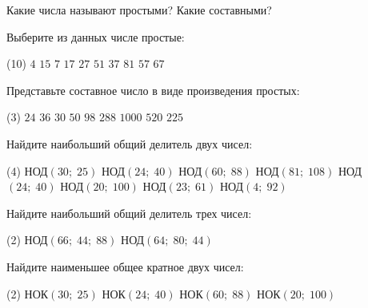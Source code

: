 %
%

\begin{class}[number=1]
\begin{listofex}
	\item Какие числа называют простыми? Какие составными?
	\item Выберите из данных числе простые:
	\begin{tasks}(10)
		\task \( 4 \)
		\task \( 15 \)
		\task \( 7 \)
		\task \( 17 \)
		\task \( 27 \)
		\task \( 51 \)
		\task \( 37 \)
		\task \( 81 \)
		\task \( 57 \)
		\task \( 67 \)
	\end{tasks}
	\item Представьте составное число в виде произведения простых:
	\begin{tasks}(3)
		\task \( 24 \)
		\task \( 36 \)
		\task \( 30 \)
		\task \( 50 \)
		\task \( 98 \)
		\task \( 288 \)
		\task \( 1000 \)
		\task \( 520 \)
		\task \( 225 \)
	\end{tasks}
	\item Найдите наибольший общий делитель двух чисел:
	\begin{tasks}(4)
		\task НОД\( (30;\;25) \)
		\task НОД\( (24;\;40) \)
		\task НОД\( (60;\;88) \)
		\task НОД\( (81;\;108) \)
		\task НОД\( (24;\;40) \)
		\task НОД\( (20;\;100) \)
		\task НОД\( (23;\;61) \)
		\task НОД\( (4;\;92) \)
	\end{tasks}
	\item Найдите наибольший общий делитель трех чисел:
	\begin{tasks}(2)
		\task НОД\( (66;\;44;\;88) \)
		\task НОД\( (64;\;80;\;44) \)
	\end{tasks}
	\item Найдите наименьшее общее кратное двух чисел:
	\begin{tasks}(2)
		\task НОК\( (30;\;25) \)
		\task НОК\( (24;\;40) \)
		\task НОК\( (60;\;88) \)
		\task НОК\( (20;\;100) \)
	\end{tasks}
	\end{listofex}
\end{class}

